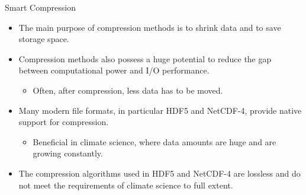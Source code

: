 \documentclass[compress,11pt,xcolor=svgnames,aspectratio=169]{beamer}
\begin{document}
\begin{frame}[fragile]{Smart Compression}

\begin{itemize}
\setlength\itemsep{0.4cm}

\item The main purpose of compression methods is to shrink data and to save storage space.

\item Compression methods also possess a huge potential to reduce the gap between computational power and I/O performance.
\begin{itemize}
\item Often, after compression, less data has to be moved.
\end{itemize}

\item Many modern file formats, in particular HDF5 and NetCDF-4, provide native support for compression.
\begin{itemize}
\item Beneficial in climate science, where data amounts are huge and are growing constantly.
\end{itemize}

\item The compression algorithms used in HDF5 and NetCDF-4 are lossless and do not meet the requirements of climate science to full extent.

\end{itemize}

\end{frame}
\end{document}
